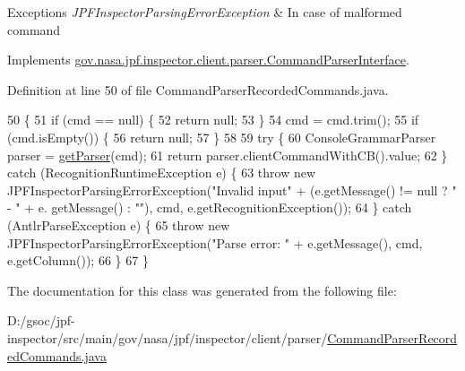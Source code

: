 \begin{DoxyExceptions}{Exceptions}
{\em J\+P\+F\+Inspector\+Parsing\+Error\+Exception} & In case of malformed command \\
\hline
\end{DoxyExceptions}


Implements \hyperlink{interfacegov_1_1nasa_1_1jpf_1_1inspector_1_1client_1_1parser_1_1_command_parser_interface_a14ea3eaa90add073b3248a9792a26ca9}{gov.\+nasa.\+jpf.\+inspector.\+client.\+parser.\+Command\+Parser\+Interface}.



Definition at line 50 of file Command\+Parser\+Recorded\+Commands.\+java.


\begin{DoxyCode}
50                                                                                                     \{
51     \textcolor{keywordflow}{if} (cmd == null) \{
52       \textcolor{keywordflow}{return} null;
53     \}
54     cmd = cmd.trim();
55     \textcolor{keywordflow}{if} (cmd.isEmpty()) \{
56       \textcolor{keywordflow}{return} null;
57     \}
58 
59     \textcolor{keywordflow}{try} \{
60       ConsoleGrammarParser parser = \hyperlink{classgov_1_1nasa_1_1jpf_1_1inspector_1_1client_1_1parser_1_1_command_parser_a4f3a71d89c26fff8ef0f3aa1d5c037be}{getParser}(cmd);
61       \textcolor{keywordflow}{return} parser.clientCommandWithCB().value;
62     \} \textcolor{keywordflow}{catch} (RecognitionRuntimeException e) \{
63       \textcolor{keywordflow}{throw} \textcolor{keyword}{new} JPFInspectorParsingErrorException(\textcolor{stringliteral}{"Invalid input"} + (e.getMessage() != null ? \textcolor{stringliteral}{" - "} + e.
      getMessage() : \textcolor{stringliteral}{""}), cmd, e.getRecognitionException());
64     \} \textcolor{keywordflow}{catch} (AntlrParseException e) \{
65       \textcolor{keywordflow}{throw} \textcolor{keyword}{new} JPFInspectorParsingErrorException(\textcolor{stringliteral}{"Parse error: "} + e.getMessage(), cmd, e.getColumn());
66     \}
67   \}
\end{DoxyCode}


The documentation for this class was generated from the following file\+:\begin{DoxyCompactItemize}
\item 
D\+:/gsoc/jpf-\/inspector/src/main/gov/nasa/jpf/inspector/client/parser/\hyperlink{_command_parser_recorded_commands_8java}{Command\+Parser\+Recorded\+Commands.\+java}\end{DoxyCompactItemize}
